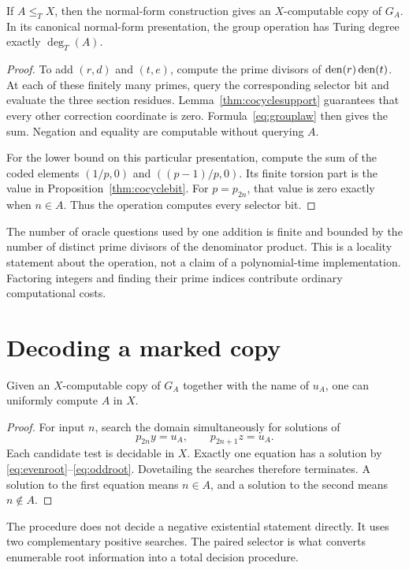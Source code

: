 \begin{proposition}
\label{thm:computeupper}
If $A\le_T X$, then the normal-form construction gives an $X$-computable copy of $G_A$. In its canonical normal-form presentation, the group operation has Turing degree exactly $\deg_T(A)$.
\end{proposition}
\begin{proof}
To add $(r,d)$ and $(t,e)$, compute the prime divisors of $\operatorname{den}(r)\operatorname{den}(t)$. At each of these finitely many primes, query the corresponding selector bit and evaluate the three section residues. Lemma~\ref{thm:cocyclesupport} guarantees that every other correction coordinate is zero. Formula~\eqref{eq:grouplaw} then gives the sum. Negation and equality are computable without querying $A$.

For the lower bound on this particular presentation, compute the sum of the coded elements $(1/p,0)$ and $((p-1)/p,0)$. Its finite torsion part is the value in Proposition~\ref{thm:cocyclebit}. For $p=p_{2n}$, that value is zero exactly when $n\in A$. Thus the operation computes every selector bit.
\end{proof}
The number of oracle questions used by one addition is finite and bounded by the number of distinct prime divisors of the denominator product. This is a locality statement about the operation, not a claim of a polynomial-time implementation. Factoring integers and finding their prime indices contribute ordinary computational costs.

\section{Decoding a marked copy}
\begin{proposition}
\label{thm:markeddecode}
Given an $X$-computable copy of $G_A$ together with the name of $u_A$, one can uniformly compute $A$ in $X$.
\end{proposition}
\begin{proof}
For input $n$, search the domain simultaneously for solutions of
\[
p_{2n}y=u_A,\qquad p_{2n+1}z=u_A.
\]
Each candidate test is decidable in $X$. Exactly one equation has a solution by \eqref{eq:evenroot}--\eqref{eq:oddroot}. Dovetailing the searches therefore terminates. A solution to the first equation means $n\in A$, and a solution to the second means $n\notin A$.
\end{proof}
The procedure does not decide a negative existential statement directly. It uses two complementary positive searches. The paired selector is what converts enumerable root information into a total decision procedure.

